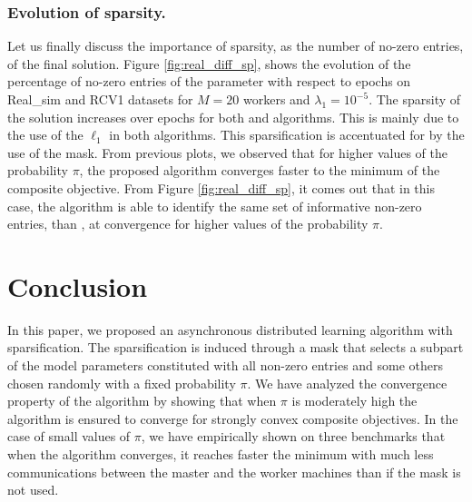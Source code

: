 \subsubsection{Evolution of sparsity.}

Let us finally discuss the importance of sparsity, as the number of no-zero entries, of the final solution. Figure \ref{fig:real_diff_sp}, shows the evolution of the percentage of no-zero entries of the parameter with respect to epochs on Real\_sim  and RCV1 datasets for $M=20$ workers and $\lambda_1=10^{-5}$. The sparsity of the solution increases over epochs for both \dave{} and \SP{} algorithms. This is mainly due to the use of the $\ell_1$ in both algorithms. This sparsification is accentuated for \SP{} by the use of the mask. From previous plots, we observed that for higher values of the probability $\pi$, the proposed algorithm converges faster to the minimum of the composite objective. From Figure \ref{fig:real_diff_sp}, it comes out that in this case, the \SP{} algorithm is able to identify the same set of informative non-zero entries, than \dave{}, at convergence for higher values of the probability $\pi$.

\section{Conclusion}\label{sec:conclusion}
In this paper, we proposed an asynchronous distributed learning algorithm with sparsification. The sparsification is induced through a mask that selects a subpart of the model parameters constituted with all non-zero entries and some others chosen randomly with a fixed probability $\pi$. We have analyzed the convergence property of the algorithm by showing that when $\pi$ is moderately high the algorithm is ensured to converge for strongly convex composite objectives. In the case of small values of $\pi$, we have empirically shown on three benchmarks that when the algorithm converges, it reaches faster the minimum with much less communications between the master and the worker machines than if the mask is not used. 